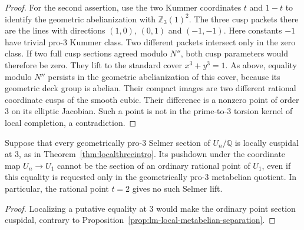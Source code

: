 \begin{proof}
For the second assertion, use the two Kummer coordinates
$t$ and $1-t$ to identify the geometric abelianization with
$\mathbb Z_3(1)^2$.  The three cusp packets there are the
lines with directions $(1,0)$, $(0,1)$ and $(-1,-1)$.
Here constants $-1$ have trivial pro-$3$ Kummer class.
Two different packets intersect only in the zero class.
If two full cusp sections agreed modulo $N''$, both cusp
parameters would therefore be zero.  They lift to the
standard cover $x^3+y^3=1$.  As above, equality modulo
$N''$ persists in the geometric abelianization of this
cover, because its geometric deck group is abelian.
Their compact images are two different rational coordinate
cusps of the smooth cubic.  Their difference is a nonzero
point of order $3$ on its elliptic Jacobian.  Such a point
is not in the prime-to-$3$ torsion kernel of local completion,
a contradiction.
\end{proof}

\begin{corollary}
\label{cor:lm-no-rational-point-lift}
Suppose that every geometrically pro-$3$ Selmer section of
$U_n/\mathbb Q$ is locally cuspidal at $3$, as in
Theorem~\ref{thm:localthreeintro}.  Its pushdown under the
coordinate map $U_n\to U_1$ cannot be the section of an
ordinary rational point of $U_1$, even if this equality is
requested only in the geometrically pro-$3$ metabelian quotient.
In particular, the rational point $t=2$ gives no such Selmer lift.
\end{corollary}
\begin{proof}
Localizing a putative equality at $3$ would make the ordinary
point section cuspidal, contrary to
Proposition~\ref{prop:lm-local-metabelian-separation}.
\end{proof}
